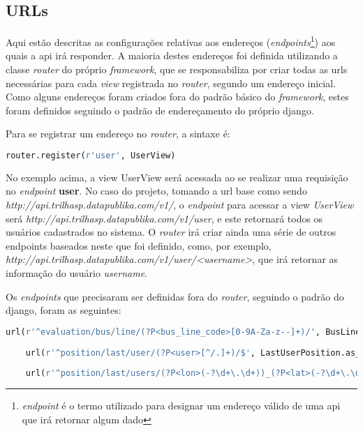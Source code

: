 \subsection{URLs}\label{subsec:util-urls}
Aqui estão descritas as configurações relativas aos endereços (\textit{endpoints}\footnote{\textit{endpoint} é o termo utilizado para designar um endereço válido de uma \gls{api} que irá retornar algum dado}) aos quais a \gls{api} irá responder.
A maioria destes endereços foi definida utilizando a classe \textit{router} do próprio \textit{framework}, que se responsabiliza por criar todas as urls necessárias para cada \textit{view} registrada no \textit{router}, segundo um endereço inicial. Como alguns endereços foram criados fora do padrão básico do \textit{framework}, estes foram definidos seguindo o padrão de endereçamento do próprio \gls{django}.

Para se registrar um endereço no \textit{router}, a sintaxe é:
\begin{lstlisting}[language=Python,caption={Sintaxe padrão para registro de endereço no \textit{router}}]
router.register(r'user', UserView)
\end{lstlisting}
No exemplo acima, a view UserView será acessada ao se realizar uma requisição no \textit{endpoint} \textbf{user}. No caso do projeto, tomando a url base como sendo \textit{http://api.trilhasp.datapublika.com/v1/}, o \textit{endpoint} para acessar a view \textit{UserView} será \textit{http://api.trilhasp.datapublika.com/v1/user}, e este retornará todos os usuários cadastrados no sistema. O \textit{router} irá criar ainda uma série de outros endpoints baseados neste que foi definido, como, por exemplo, 
\textit{http://api.trilhasp.datapublika.com/v1/user/<username>}, que irá retornar as informação do usuário \textit{username}.

Os \textit{endpoints} que precisaram ser definidas fora do \textit{router}, seguindo o padrão do \gls{django}, foram as seguintes:
\begin{lstlisting}[language=Python,caption={EndPoints definidos manualmente}]
    url(r'^evaluation/bus/line/(?P<bus_line_code>[0-9A-Za-z--]+)/', BusLineViewSet.as_view(), name='bus-line'),
    
    url(r'^position/last/user/(?P<user>[^/.]+)/$', LastUserPosition.as_view(), name='lastlocation-detail'),
    
    url(r'^position/last/users/(?P<lon>(-?\d+\.\d+))_(?P<lat>(-?\d+\.\d+))/$', LastUsersAtPosition.as_view(), name='lastuserslocation-detail'),
\end{lstlisting}

